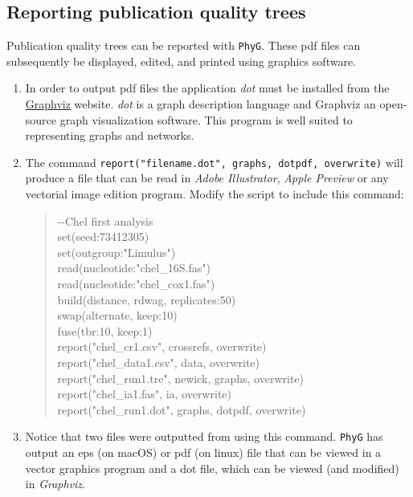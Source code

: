\documentclass[]{article}
\newcommand{\phyg}{\texttt{PhyG} }
\begin{document}
\subsection{Reporting publication quality trees}
\label{subsec:dotpdf}

Publication quality trees can be reported with \texttt{PhyG}. These pdf files can  
subsequently be displayed, edited, and printed using graphics software.

\begin{enumerate}

\item In order to output pdf files the application \textit{dot} must be installed from 
the \href{https://graphviz.org/download/}{Graphviz} website. \textit{dot} is a graph 
description language and Graphviz an open-source graph visualization software. 
This program is well suited to representing graphs and networks.

\item  The command \texttt{report("filename.dot", graphs, dotpdf, overwrite)} will 
produce a file that can be read in \textit{Adobe Illustrator}, \textit{Apple Preview} 
or any vectorial image edition program. Modify the script to include this command:

	\begin{quote}
	-\/-Chel first analysis\\
	set(seed:73412305)\\
	set(outgroup:"Limulus")\\
	read(nucleotide:"chel\_16S.fas")\\
	read(nucleotide:"chel\_cox1.fas")\\
	build(distance, rdwag, replicates:50)\\
	swap(alternate, keep:10)\\
	fuse(tbr:10, keep:1)\\
	report("chel\_cr1.csv", crossrefs, overwrite)\\
	report("chel\_data1.csv", data, overwrite)\\
	report("chel\_run1.tre", newick, graphs, overwrite)\\
	report("chel\_ia1.fas", ia, overwrite)\\
	report("chel\_run1.dot", graphs, dotpdf, overwrite)\\
	\end{quote}
	
\item Notice that two files were outputted from using this command. \phyg has 
output an eps (on macOS) or pdf (on linux) file that can be viewed in a vector graphics 
program and a dot file, which can be viewed (and modified) in \textit{Graphviz}.
\end{enumerate}
\end{document}

